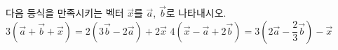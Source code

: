 다음 등식을 만족시키는 벡터 $\vec{x}$를 $\vec{a}$, $\vec{b}$로 나타내시오.
 $3(\vec{a}+\vec{b}+\vec{x})=2(3\vec{b}-2\vec{a})+2\vec{x}$
 $4(\vec{x}-\vec{a}+2\vec{b})=3\left(2\vec{a}-\dfrac{2}{3}\vec{b}\right)-\vec{x}$
